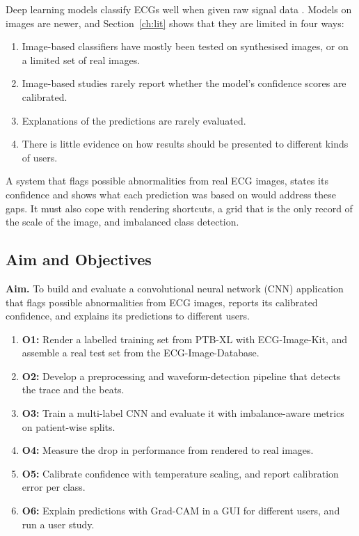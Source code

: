 \documentclass[12pt,nonacm,acmlarge,titlepage,screen]{acmart}
\begin{document}
Deep learning models classify ECGs well when given raw signal data
\cite{hannun_cardiologist_2019,ribeiro_automatic_2020}. Models on images are newer, and
Section~\ref{ch:lit} shows that they are limited in four ways:
\begin{enumerate}\setlength{\itemsep}{0pt}\setlength{\parskip}{0pt}
  \item Image-based classifiers have mostly been tested on synthesised images, or on a limited set of real images.
  \item Image-based studies rarely report whether the model's confidence scores are calibrated.
  \item Explanations of the predictions are rarely evaluated.
  \item There is little evidence on how results should be presented to different kinds of users.
\end{enumerate}
A system that flags possible abnormalities from real ECG images, states its confidence and shows what each prediction was based on would address these gaps. It must also cope with rendering shortcuts, a grid that is the only record of the scale of the image, and imbalanced class detection.

\subsection{Aim and Objectives}

\textbf{Aim.} To build and evaluate a convolutional neural network (CNN) application that
flags possible abnormalities from ECG images, reports its calibrated confidence, and explains its predictions to different users.

\begin{enumerate}\setlength{\itemsep}{0pt}\setlength{\parskip}{0pt}
  \item \textbf{O1:} Render a labelled training set from PTB-XL with ECG-Image-Kit, and assemble a real test set from the ECG-Image-Database.
  \item \textbf{O2:} Develop a preprocessing and waveform-detection pipeline that detects the trace and the beats.
  \item \textbf{O3:} Train a multi-label CNN and evaluate it with imbalance-aware metrics on patient-wise splits.
  \item \textbf{O4:} Measure the drop in performance from rendered to real images.
  \item \textbf{O5:} Calibrate confidence with temperature scaling, and report calibration error per class.
  \item \textbf{O6:} Explain predictions with Grad-CAM in a GUI for different users, and run a user study.
\end{enumerate}
\end{document}
